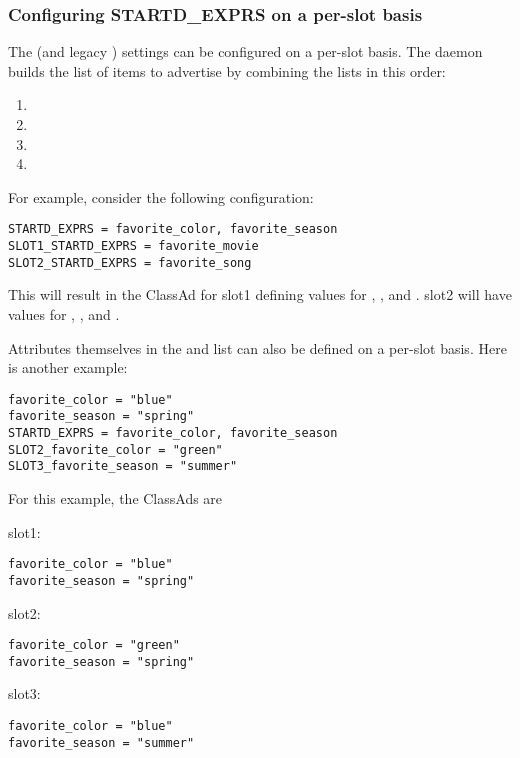 \subsubsection{\label{sec:SMP-exprs}
Configuring STARTD\_EXPRS on a per-slot basis}

The  (and legacy ) settings
can be configured on a per-slot basis.
The  daemon builds the list of items to
advertise by combining the lists in this order:
\begin{enumerate}
\item{}
\item{}
\item{}
\item{}
\end{enumerate}

For example, consider the following configuration:
\begin{verbatim}
STARTD_EXPRS = favorite_color, favorite_season
SLOT1_STARTD_EXPRS = favorite_movie
SLOT2_STARTD_EXPRS = favorite_song
\end{verbatim}

This will result in the  ClassAd for
slot1 defining values for
, ,
and .
slot2 will have values for
, , and .

Attributes themselves in the 
and  list
can also be defined on a per-slot basis.
Here is another example:

\begin{verbatim}
favorite_color = "blue"
favorite_season = "spring"
STARTD_EXPRS = favorite_color, favorite_season
SLOT2_favorite_color = "green"
SLOT3_favorite_season = "summer"
\end{verbatim}

For this example, the  ClassAds are
\begin{description}
\item{slot1}:
\begin{verbatim}
favorite_color = "blue"
favorite_season = "spring"
\end{verbatim}
\item{slot2}:
\begin{verbatim}
favorite_color = "green"
favorite_season = "spring"
\end{verbatim}
\item{slot3}:
\begin{verbatim}
favorite_color = "blue"
favorite_season = "summer"
\end{verbatim}
\end{description}

